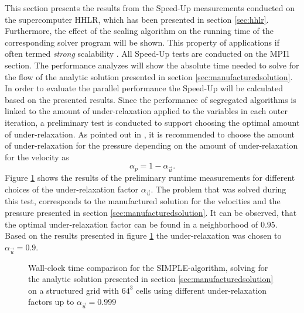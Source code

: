 This section presents the results from the Speed-Up measurements conducted on the supercomputer HHLR, which has been presented in section \ref{sec:hhlr}. Furthermore, the effect of the scaling algorithm on the running time of the corresponding solver program will be shown. This property of applications if often termed \emph{strong} scalability \cite{hager11}. All Speed-Up tests are conducted on the MPI1 section. The performance analyzes will show the absolute time needed to solve for the flow of the analytic solution presented in section \ref{sec:manufacturedsolution}. In order to evaluate the parallel performance the Speed-Up will be calculated based on the presented results. Since the performance of segregated algorithms is linked to the amount of under-relaxation applied to the variables in each outer iteration, a preliminary test is conducted to support choosing the optimal amount of under-relaxation. As pointed out in \cite{ferziger02,schaefer99}, it is recommended to choose the amount of under-relaxation for the pressure depending on the amount of under-relaxation for the velocity as
\begin{displaymath}
  \alpha_p = 1 - \alpha_{\vec{u}}.
\end{displaymath}
Figure \ref{fig:underrelax} shows the results of the preliminary runtime measurements for different choices of the under-relaxation factor \( \alpha_{\vec{u}} \). The problem that was solved during this test, corresponds to the manufactured solution for the velocities and the pressure presented in section \ref{sec:manufacturedsolution}. It can be observed, that the optimal under-relaxation factor can be found in a neighborhood of \(0.95\). Based on the results presented in figure \ref{fig:underrelax} the under-relaxation was chosen to \( \alpha_{\vec{u}} =0.9 \). 

\begin{figure}[h!]
  \centering
  \caption{Wall-clock time comparison for the SIMPLE-algorithm, solving for the analytic solution presented in section \ref{sec:manufacturedsolution} on a structured grid with $64^3$ cells using different under-relaxation factors up to $\alpha_\vec{u}=0.999$}
  \label{fig:underrelax}
\end{figure}


